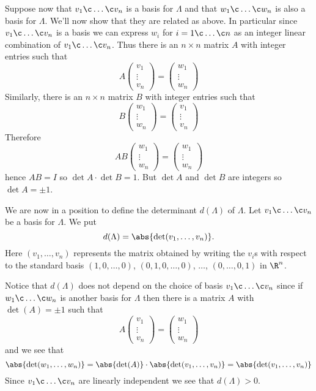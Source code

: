 Suppose now that $v_1\c \dotsc\c v_n$ is a basis for $\Lambda$ and that $w_1\c \dotsc\c w_n$ is also a basis for $\Lambda$.  We'll now show that they are related as above.  In particular since $v_1\c \dotsc\c v_n$ is a basis we can express $w_i$ for $i=1\c \dotsc\c n$ as an integer linear combination of $v_1\c \dotsc\c v_n$.  Thus there is an $n\times n$ matrix $A$ with integer entries such that
\[ A \begin{pmatrix}v_1\\\vdots\\v_n\end{pmatrix} = \begin{pmatrix}w_1\\\vdots\\w_n\end{pmatrix} \]
Similarly, there is an $n\times n$ matrix $B$ with integer entries such that
\[ B \begin{pmatrix}w_1\\\vdots\\w_n\end{pmatrix} = \begin{pmatrix}v_1\\\vdots\\v_n\end{pmatrix} \]
Therefore
\[ AB \begin{pmatrix}w_1\\\vdots\\w_n\end{pmatrix} = \begin{pmatrix}w_1\\\vdots\\w_n\end{pmatrix} \]
hence $AB=I$ so $\det A\cdot\det B=1$.  But $\det A$ and $\det B$ are integers so $\det A=\pm1$.

We are now in a position to define the determinant $d(\Lambda)$ of $\Lambda$.  Let $v_1\c \dotsc\c v_n$ be a basis for $\Lambda$.  We put
\[ d(\Lambda) = \abs{\det(v_1,\dotsc,v_n)} . \]
Here $(v_1,\dotsc,v_n)$ represents the matrix obtained by writing the $v_i$s with respect to the standard basis $(1,0,\dotsc,0)$, $(0,1,0,\dotsc,0)$, $\dotsc$, $(0,\dotsc,0,1)$ in $\R^n$.

Notice that $d(\Lambda)$ does not depend on the choice of basis $v_1\c \dotsc\c v_n$ since if $w_1\c \dotsc\c w_n$ is another basis for $\Lambda$ then there is a matrix $A$ with $\det(A)=\pm1$ such that
\[ A \begin{pmatrix}v_1\\\vdots\\v_n\end{pmatrix} = \begin{pmatrix}w_1\\\vdots\\w_n\end{pmatrix} \]
and we see that
\[ \abs{\det(w_1,\dotsc,w_n)} = \abs{\det(A)}\cdot\abs{\det(v_1,\dotsc,v_n)} = \abs{\det(v_1,\dotsc,v_n)} \]
\remark Since $v_1\c \dotsc\c v_n$ are linearly independent we see that $d(\Lambda)>0$.

